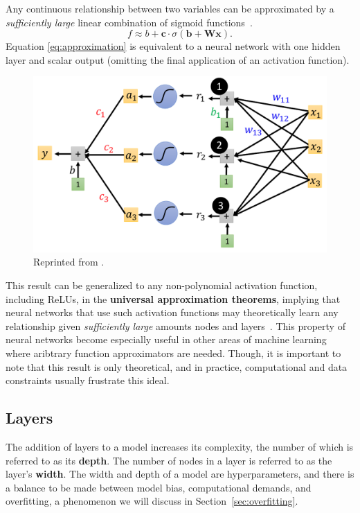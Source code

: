 \documentclass[12pt]{report}
\theoremstyle{definition}
\theoremstyle{remark}
\begin{document}
Any continuous relationship between two variables can be approximated by a \textit{sufficiently large} linear combination of sigmoid functions~\cite{cybenko_approximation_1989}.
\begin{equation} \label{eq:approximation}
    f \approx b + \mathbf{c} \cdot \sigma(\mathbf{b} + \mathbf{W}\mathbf{x}).
\end{equation}
Equation \ref{eq:approximation} is equivalent to a neural network with one hidden layer and scalar output (omitting the final application of an activation function).
\begin{figure}[h]
    \centering
    \includegraphics[width=0.5\linewidth]{figs/simple.png}
    \caption{Reprinted from \cite{lee_introduction_2021}.}
    \label{fig:enter-label}
\end{figure}

This result can be generalized to any non-polynomial activation function, including ReLUs, in the \textbf{universal approximation theorems}, implying that neural networks that use such activation functions may theoretically learn any relationship given \textit{sufficiently large} amounts nodes and layers~\cite{hornik_multilayer_1989, kidger_universal_2020, pinkus_approximation_1999}. This property of neural networks become especially useful in other areas of machine learning where aribtrary function approximators are needed. Though, it is important to note that this result is only theoretical, and in practice, computational and data constraints usually frustrate this ideal.

\subsection{Layers}

The addition of layers to a model increases its complexity, the number of which is referred to as its \textbf{depth}. The number of nodes in a layer is referred to as the layer's \textbf{width}. The width and depth of a model are hyperparameters, and there is a balance to be made between model bias, computational demands, and overfitting, a phenomenon we will discuss in Section~\ref{sec:overfitting}.
\end{document}
